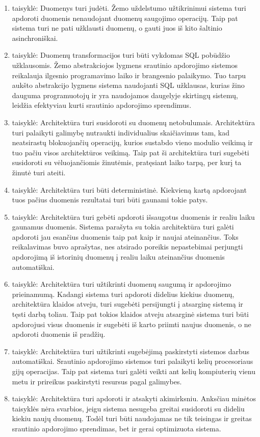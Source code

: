 \documentclass{VUMIFPSkursinis}
\begin{document}
\begin{enumerate}[label=\arabic*]
    \item taisyklė: Duomenys turi judėti. Žemo uždelstumo užtikrinimui sistema turi apdoroti duomenis nenaudojant duomenų saugojimo operacijų. 
    Taip pat sistema turi ne pati užklausti duomenų, o gauti juos iš kito šaltinio asinchroniškai. 
    \item taisyklė: Duomenų transformacijos turi būti vykdomas SQL pobūdžio užklausomis. Žemo abstrakciojos lygmens srautinio apdorojimo sistemos reikalauja ilgesnio 
    programavimo laiko ir brangesnio palaikymo. Tuo tarpu aukšto abstrakcijo lygmens sistema 
    naudojanti SQL užklausas, kurias žino dauguma programuotojų ir yra naudojamos daugelyje skirtingų sistemų, leidžia efektyviau kurti srautinio apdorojimo sprendimus.
    \item taisyklė: Architektūra turi susidoroti su duomenų netobulumais. Architektūra turi palaikyti galimybę nutraukti individualius skaičiavimus
    tam, kad neatsirastų blokuojančių operacijų, kurios sustabdo vieno modulio veikimą ir tuo pačiu visos architektūros veikimą. Taip pat ši 
    architektūra turi sugebėti susidoroti su vėluojančiomis žinutėmis, pratęsiant laiko tarpą, per kurį ta žinutė turi ateiti.
    \item taisyklė: Architektūra turi būti deterministinė. Kiekvieną kartą apdorojant tuos pačius duomenis rezultatai turi būti gaunami tokie patys.
    \item taisyklė: Architektūra turi gebėti apdoroti išsaugotus duomenis ir realiu laiku gaunamus duomenis. Sistema parašyta su tokia architektūra turi galėti apdoroti jau esančius duomenis taip pat kaip ir 
    naujai ateinančius. Toks reikalavimas buvo aprašytas, nes atsirado poreikis nepastebimai perjungti apdorojimą iš istorinių duomenų į realiu laiku ateinančius duomenis automatiškai.
    \item taisyklė: Architektūra turi užtikrinti duomenų saugumą ir apdorojimo prieinamumą. Kadangi sistema turi apdoroti didelius kiekius duomenų, architektūra klaidos atveju, turi sugebėti persijungti į atsarginę
    sistemą ir tęsti darbą toliau. Taip pat tokios klaidos atveju atsarginė sistema turi būti apdorojusi visus duomenis ir sugebėti iš karto priimti naujus duomenis, o ne apdoroti duomenis iš pradžių.
    \item taisyklė: Architektūra turi užtikrinti sugebėjimą paskirstyti sistemos darbus automatiškai. Srautinio apdorojimo sistemos turi palaikyti kelių procesoriaus gijų operacijas. Taip pat sistema turi galėti 
    veikti ant kelių kompiuterių vienu metu ir prireikus paskirstyti resursus pagal galimybes.
    \item taisyklė: Architektūra turi apdoroti ir atsakyti akimirksniu. Anksčiau minėtos taisyklės nėra svarbios, jeigu sistema nesugeba greitai susidoroti su dideliu kiekiu naujų duomenų. 
    Todėl turi būti naudojamas ne tik teisingas ir greitas srautinio apdorojimo sprendimas, bet ir gerai optimizuota sistema.
\end{enumerate}\par 
\end{document}
